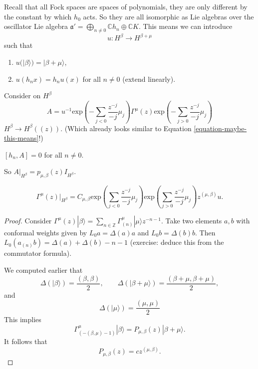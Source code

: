 Recall that all Fock spaces are spaces of
polynomials,
they are only different by the constant by
which $h_0$ acts.
So they are all isomorphic as Lie algebras
over the oscillator Lie algebra
$\mathfrak{a}'=\bigoplus_{n \neq
0}\mathbb{C}h_n \oplus \mathbb{C}K$.
This means we can introduce
$$
u:H^\beta \to H^{\beta+\mu}
$$
such that
\begin{enumerate}
\item $u(|\beta\rangle)=|\beta+\mu\rangle$,
\item $u(h_nx)=h_nu(x)$ for all  $n \neq 0$
(extend linearly).
\end{enumerate}

\noindent
Consider on $H^\beta$
\begin{equation}
\label{equation-quantum-field-vmod}
A=u^{-1}\text{exp}\left(-\sum_{j<0}\frac{z^{-
j}}{-j}\mu_j\right)\Gamma^\mu(z)
\text{exp}\left(-\sum_{j>0}\frac{z^{-j}}{-j}
\mu_j\right)
\end{equation}
$H^\beta \to H^\beta((z))$.
(Which already looks similar to Equation
\ref{equation-maybe-this-means}!)

\begin{exercise}
\label{exercise-a-and-hn}
$[h_n,A]=0$ for all $n \neq 0$.
\end{exercise}

\noindent
So
$A|_{H^{\beta}}=p_{\mu,\beta}(z)I_{H^\beta}$.

\begin{proposition}
\label{proposition-exponentials}
$$
\Gamma^\mu(z)|_{H^\beta}=C_{\mu,\beta}
\text{exp}\left(\sum_{j<0}\frac{z^{-j}}{-j}
\mu_j\right)
\text{exp}\left(\sum_{j>0}\frac{z^{-j}}{-j}
\mu_j\right)z^{(\mu,\beta)}u.
$$
\end{proposition}

\begin{proof}
Consider $\Gamma^\mu(z)|\beta\rangle=
\sum_{n \in
\mathbb{Z}}\Gamma^\mu_{(n)}|\mu\rangle
z^{-n-1}$.
Take two elements $a,b$ with conformal
weights given by
 $L_0a=\Delta(a)a$ and $L_0b=\Delta(b)b$.
Then $L_0(a_{(n)}b)=\Delta(a)+\Delta(b)-n-1$
(exercise: deduce this from the commutator
formula).

We computed earlier that
$$
\Delta(|\beta\rangle)=\frac{(\beta,\beta)}{2}
,\qquad
\Delta(|\beta+\mu\rangle)=\frac{(\beta+\mu,
\beta+\mu)}{2},
$$
and
$$
\Delta(|\mu\rangle)=\frac{(\mu,\mu)}{2}
$$
This implies
$$
\Gamma^\mu_{(-(\beta,\mu)-1)}|\beta\rangle
=P_{\mu,\beta}(z)|\beta+\mu\rangle.
$$
It follows that
$$
P_{\mu,\beta}(z)=c z^{(\mu,\beta)}.
$$
\end{proof}

